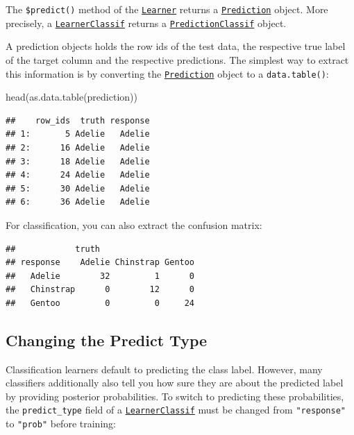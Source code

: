 \documentclass[
]{scrbook}
\newenvironment{Shaded}{\begin{snugshade}}{\end{snugshade}}
\newcommand{\FunctionTok}[1]{\textcolor[rgb]{0.00,0.00,0.00}{#1}}
\newcommand{\NormalTok}[1]{#1}
\newcommand{\SpecialCharTok}[1]{\textcolor[rgb]{0.00,0.00,0.00}{#1}}
\renewenvironment{Shaded} {\begin{snugshade}\small} {\end{snugshade}}
\begin{document}
The \texttt{\$predict()} method of the \href{https://mlr3.mlr-org.com/reference/Learner.html}{\texttt{Learner}} returns a \href{https://mlr3.mlr-org.com/reference/Prediction.html}{\texttt{Prediction}} object.
More precisely, a \href{https://mlr3.mlr-org.com/reference/LearnerClassif.html}{\texttt{LearnerClassif}} returns a \href{https://mlr3.mlr-org.com/reference/PredictionClassif.html}{\texttt{PredictionClassif}} object.

A prediction objects holds the row ids of the test data, the respective true label of the target column and the respective predictions.
The simplest way to extract this information is by converting the \href{https://mlr3.mlr-org.com/reference/Prediction.html}{\texttt{Prediction}} object to a \texttt{data.table()}:

\begin{Shaded}
\begin{Highlighting}[]
\FunctionTok{head}\NormalTok{(}\FunctionTok{as.data.table}\NormalTok{(prediction))}
\end{Highlighting}
\end{Shaded}

\begin{verbatim}
##    row_ids  truth response
## 1:       5 Adelie   Adelie
## 2:      16 Adelie   Adelie
## 3:      18 Adelie   Adelie
## 4:      24 Adelie   Adelie
## 5:      30 Adelie   Adelie
## 6:      36 Adelie   Adelie
\end{verbatim}

For classification, you can also extract the confusion matrix:

\begin{Shaded}
\end{Shaded}

\begin{verbatim}
##            truth
## response    Adelie Chinstrap Gentoo
##   Adelie        32         1      0
##   Chinstrap      0        12      0
##   Gentoo         0         0     24
\end{verbatim}

\hypertarget{predict-type}{%
\subsection{Changing the Predict Type}\label{predict-type}}

Classification learners default to predicting the class label.
However, many classifiers additionally also tell you how sure they are about the predicted label by providing posterior probabilities.
To switch to predicting these probabilities, the \texttt{predict\_type} field of a \href{https://mlr3.mlr-org.com/reference/LearnerClassif.html}{\texttt{LearnerClassif}} must be changed from \texttt{"response"} to \texttt{"prob"} before training:
\end{document}
